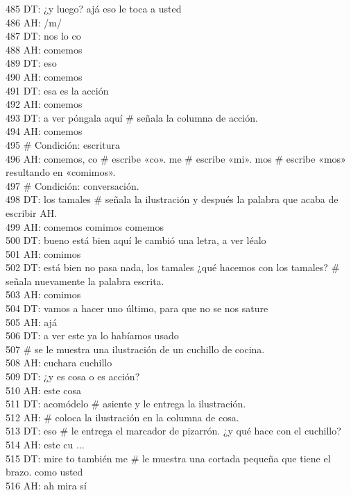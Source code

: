 485 DT: ¿y luego? ajá eso le toca a usted\\
486 AH: /m/\\
487 DT: nos lo co\\
488 AH: comemos\\
489 DT: eso\\
490 AH: comemos\\
491 DT: esa es la acción\\
492 AH: comemos\\
493 DT: a ver póngala aquí # señala la columna de acción.\\
494 AH: comemos\\
495 # Condición: escritura\\
496 AH: comemos, co # escribe «co». me # escribe «mi». mos # escribe «mos» resultando en «comimos».\\
497 # Condición: conversación.\\
498 DT: los tamales # señala la ilustración y después la palabra que acaba de escribir AH.\\
499 AH: comemos comimos comemos\\
500 DT: bueno está bien aquí le cambió una letra, a ver léalo\\
501 AH: comimos\\
502 DT: está bien no pasa nada, los tamales ¿qué hacemos con los tamales? # señala nuevamente la palabra escrita.\\
503 AH: comimos\\
504 DT: vamos a hacer uno último, para que no se nos sature\\
505 AH: ajá\\
506 DT: a ver este ya lo habíamos usado\\
507 # se le muestra una ilustración de un cuchillo de cocina.\\
508 AH: cuchara cuchillo\\
509 DT: ¿y es cosa o es acción?\\
510 AH: este cosa\\
511 DT: acomódelo # asiente y le entrega la ilustración.\\
512 AH: # coloca la ilustración en la columna de cosa.\\
513 DT: eso # le entrega el marcador de pizarrón. ¿y qué hace con el cuchillo?\\
514 AH: este cu ...\\
515 DT: mire to también me # le muestra una cortada pequeña que tiene el brazo. como usted\\
516 AH: ah mira sí\\
